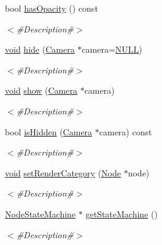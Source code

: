 \begin{DoxyCompactItemize}
bool \mbox{\hyperlink{classnjli_1_1_node_aefe134d367769f34fff2c6eebbba519d}{has\+Opacity}} () const
\begin{DoxyCompactList}\small\item\em $<$\#\+Description\#$>$ \end{DoxyCompactList}\item 
\mbox{\hyperlink{_thread_8h_af1e856da2e658414cb2456cb6f7ebc66}{void}} \mbox{\hyperlink{classnjli_1_1_node_acf8e0b415e5b6e1c753ec9f0de5ec61d}{hide}} (\mbox{\hyperlink{classnjli_1_1_camera}{Camera}} $\ast$camera=\mbox{\hyperlink{_util_8h_a070d2ce7b6bb7e5c05602aa8c308d0c4}{N\+U\+LL}})
\begin{DoxyCompactList}\small\item\em $<$\#\+Description\#$>$ \end{DoxyCompactList}\item 
\mbox{\hyperlink{_thread_8h_af1e856da2e658414cb2456cb6f7ebc66}{void}} \mbox{\hyperlink{classnjli_1_1_node_a53575c84555fe0884f9c8a1db69415f5}{show}} (\mbox{\hyperlink{classnjli_1_1_camera}{Camera}} $\ast$camera)
\begin{DoxyCompactList}\small\item\em $<$\#\+Description\#$>$ \end{DoxyCompactList}\item 
bool \mbox{\hyperlink{classnjli_1_1_node_a8e2d933072775e46519812b890f44b26}{is\+Hidden}} (\mbox{\hyperlink{classnjli_1_1_camera}{Camera}} $\ast$camera) const
\begin{DoxyCompactList}\small\item\em $<$\#\+Description\#$>$ \end{DoxyCompactList}\item 
\mbox{\hyperlink{_thread_8h_af1e856da2e658414cb2456cb6f7ebc66}{void}} \mbox{\hyperlink{classnjli_1_1_node_a62df3bc99a3cb060be7532b6c265eb4b}{set\+Render\+Category}} (\mbox{\hyperlink{classnjli_1_1_node}{Node}} $\ast$node)
\begin{DoxyCompactList}\small\item\em $<$\#\+Description\#$>$ \end{DoxyCompactList}\item 
\mbox{\hyperlink{classnjli_1_1_node_state_machine}{Node\+State\+Machine}} $\ast$ \mbox{\hyperlink{classnjli_1_1_node_a0e952bbd0ad0bbbe33f42639b9af844f}{get\+State\+Machine}} ()
\begin{DoxyCompactList}\small\item\em $<$\#\+Description\#$>$ \end{DoxyCompactList}\item 

\end{DoxyCompactItemize}
